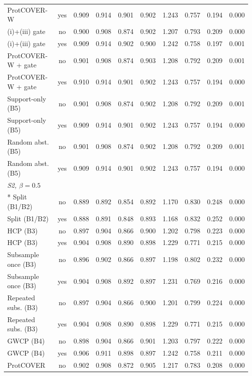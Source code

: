 \begin{longtable}{lccccccccc}
ProtCOVER-W & yes & 0.909 & 0.914 & 0.901 & 0.902 & 1.243 & 0.757 & 0.194 & 0.000 \\
(i)+(iii) gate & no & 0.900 & 0.908 & 0.874 & 0.902 & 1.207 & 0.793 & 0.209 & 0.000 \\
(i)+(iii) gate & yes & 0.909 & 0.914 & 0.902 & 0.900 & 1.242 & 0.758 & 0.197 & 0.001 \\
ProtCOVER-W + gate & no & 0.901 & 0.908 & 0.874 & 0.903 & 1.208 & 0.792 & 0.209 & 0.001 \\
ProtCOVER-W + gate & yes & 0.910 & 0.914 & 0.901 & 0.902 & 1.243 & 0.757 & 0.194 & 0.000 \\
Support-only (B5) & no & 0.901 & 0.908 & 0.874 & 0.902 & 1.208 & 0.792 & 0.209 & 0.001 \\
Support-only (B5) & yes & 0.909 & 0.914 & 0.901 & 0.902 & 1.243 & 0.757 & 0.194 & 0.000 \\
Random abst. (B5) & no & 0.901 & 0.908 & 0.874 & 0.902 & 1.208 & 0.792 & 0.209 & 0.001 \\
Random abst. (B5) & yes & 0.909 & 0.914 & 0.901 & 0.902 & 1.243 & 0.757 & 0.194 & 0.000 \\
\midrule
\multicolumn{10}{l}{\emph{S2, $\beta=0.5$}}\\*
Split (B1/B2) & no & 0.889 & 0.892 & 0.854 & 0.892 & 1.170 & 0.830 & 0.248 & 0.000 \\
Split (B1/B2) & yes & 0.888 & 0.891 & 0.848 & 0.893 & 1.168 & 0.832 & 0.252 & 0.000 \\
HCP (B3) & no & 0.897 & 0.904 & 0.866 & 0.900 & 1.202 & 0.798 & 0.223 & 0.000 \\
HCP (B3) & yes & 0.904 & 0.908 & 0.890 & 0.898 & 1.229 & 0.771 & 0.215 & 0.000 \\
Subsample once (B3) & no & 0.896 & 0.902 & 0.866 & 0.897 & 1.198 & 0.802 & 0.232 & 0.000 \\
Subsample once (B3) & yes & 0.904 & 0.908 & 0.892 & 0.897 & 1.231 & 0.769 & 0.216 & 0.000 \\
Repeated subs. (B3) & no & 0.897 & 0.904 & 0.866 & 0.900 & 1.201 & 0.799 & 0.224 & 0.000 \\
Repeated subs. (B3) & yes & 0.904 & 0.908 & 0.890 & 0.898 & 1.229 & 0.771 & 0.215 & 0.000 \\
GWCP (B4) & no & 0.898 & 0.904 & 0.866 & 0.901 & 1.203 & 0.797 & 0.222 & 0.000 \\
GWCP (B4) & yes & 0.906 & 0.911 & 0.898 & 0.897 & 1.242 & 0.758 & 0.211 & 0.000 \\
ProtCOVER & no & 0.902 & 0.908 & 0.872 & 0.905 & 1.217 & 0.783 & 0.208 & 0.000 \\

\end{longtable}
